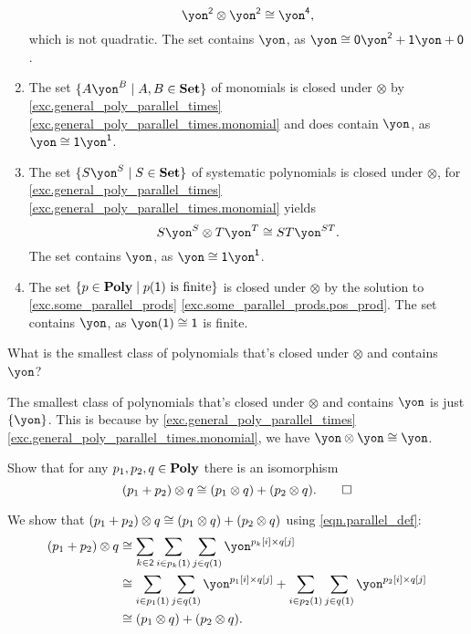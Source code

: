\documentclass[Book-Poly]{subfiles}
\begin{document}
\begin{exercise}
\begin{solution}
\begin{enumerate}
\[	    \yon^\2 \otimes \yon^\2 \iso \yon^\4,
	\]
	which is not quadratic.
	The set contains $\yon$, as $\yon \iso \0\yon^\2 + \1\yon + \0$.
	\item The set $\{A\yon^B\mid A,B\in\smset\}$ of monomials is closed under $\otimes$ by \cref{exc.general_poly_parallel_times} \cref{exc.general_poly_parallel_times.monomial} and does contain $\yon$, as $\yon \iso \1\yon^\1$.
	\item The set $\{S\yon^S\mid S\in\smset\}$ of systematic polynomials is closed under $\otimes$, for \cref{exc.general_poly_parallel_times} \cref{exc.general_poly_parallel_times.monomial} yields
	\[
	    S\yon^S \otimes T\yon^T \iso ST\yon^{ST}.
	\]
	The set contains $\yon$, as $\yon \iso \1\yon^\1$.
	\item The set $\{p\in\mathbf{Poly}\mid p(\textsf{1})\text{ is finite}\}$ is closed under $\otimes$ by the solution to \cref{exc.some_parallel_prods} \cref{exc.some_parallel_prods.pos_prod}.
	The set contains $\yon$, as $\yon(\1) \iso \1$ is finite.
\end{enumerate}
\end{solution}
\end{exercise}

\begin{exercise}
What is the smallest class of polynomials that's closed under $\otimes$ and contains $\yon$?
\begin{solution}
The smallest class of polynomials that's closed under $\otimes$ and contains $\yon$ is just $\{\yon\}$.
This is because by \cref{exc.general_poly_parallel_times} \cref{exc.general_poly_parallel_times.monomial}, we have $\yon \otimes \yon \iso \yon$.
\end{solution}
\end{exercise}

\begin{exercise}
Show that for any $p_1,p_2,q\in\mathbf{Poly}$ there is an isomorphism
\[
(p_1+p_2)\otimes q\cong (p_1\otimes q)+(p_2\otimes q).
\qedhere
\]
\begin{solution}
We show that $(p_1 + p_2) \otimes q \cong (p_1 \otimes q) + (p_2 \otimes q)$ using \eqref{eqn.parallel_def}:
\begin{align*}
    (p_1 + p_2) \otimes q &\iso \sum_{k \in \2} \sum_{i \in p_k(\1)} \sum_{j \in q(\1)} \yon^{p_k[i] \times q[j]} \\
    &\iso \sum_{i \in p_1(\1)} \sum_{j \in q(\1)} \yon^{p_1[i] \times q[j]} + \sum_{i \in p_2(\1)} \sum_{j \in q(\1)} \yon^{p_2[i] \times q[j]} \\
    &\iso (p_1 \otimes q) + (p_2 \otimes q).
\end{align*}
\end{solution}
\end{exercise}
\end{document}
